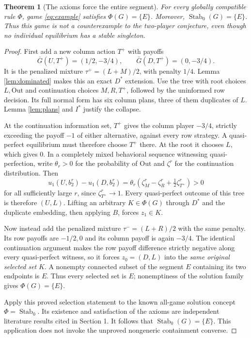 \documentclass[11pt]{article}
\newcommand{\Stab}{\operatorname{Stab}_0}
\newtheorem{theorem}{Theorem}[section]
\theoremstyle{definition}
\theoremstyle{remark}
\begin{document}
\begin{theorem}[The axioms force the entire segment]\label{thm:segment}
For every globally compatible rule $\Phi$, game \eqref{eq:example}
satisfies $\Phi(G)=\{E\}$. Moreover, $\Stab(G)=\{E\}$.
Thus this game is not a counterexample to the two-player conjecture,
even though no individual equilibrium has a stable singleton.
\end{theorem}
\begin{proof}
First add a new column action $T^+$ with payoffs
\[
 \bar G(U,T^+)=(1/2,-3/4),\qquad
 \bar G(D,T^+)=(0,-3/4).
\]
It is the penalized mixture $\tau^+=(L+M)/2$, with penalty $1/4$.
Lemma \ref{lem:dominated} makes this an exact $D^*$ extension.
Use the tree with root choices $L,\mathrm{Out}$ and continuation
choices $M,R,T^+$, followed by the uninformed row decision. Its full
normal form has six column plans, three of them duplicates of $L$.
Lemma \ref{lem:plans} and $I^*$ justify the collapse.

At the continuation information set, $T^+$ gives the column player
$-3/4$, strictly exceeding the payoff $-1$ of either alternative,
against every row strategy. A quasi-perfect equilibrium must therefore
choose $T^+$ there. At the root it chooses $L$, which gives $0$.
In a completely mixed behavioral sequence witnessing quasi-perfection,
write $\theta_r>0$ for the probability of $\mathrm{Out}$ and
$\zeta^r$ for the continuation distribution. Then
\[
 u_1(U,b_2^r)-u_1(D,b_2^r)
 =\theta_r(\zeta_M^r-\zeta_R^r+\tfrac12\zeta_{T^+}^r)>0
\]
for all sufficiently large $r$, since $\zeta_{T^+}^r\to1$.
Every quasi-perfect outcome of this tree is therefore $(U,L)$.
Lifting an arbitrary $K\in\Phi(G)$ through $D^*$ and the duplicate
embedding, then applying $B$, forces $z_1\in K$.

Now instead add the penalized mixture $\tau^-=(L+R)/2$ with the same
penalty. Its row payoffs are $-1/2,0$ and its column payoff is again
$-3/4$. The identical continuation argument makes the row payoff difference
strictly negative along every quasi-perfect witness, so it forces
$z_0=(D,L)$ into the \emph{same original selected set} $K$.
A nonempty connected subset of the segment $E$ containing its two
endpoints is $E$. Thus every selected set is $E$; nonemptiness of the
solution family gives $\Phi(G)=\{E\}$.

Apply this proved selection statement to the known all-game solution
concept $\Phi=\Stab$. Its existence and satisfaction of the axioms are
independent literature results cited in Section 1. It follows that
$\Stab(G)=\{E\}$. This application does not invoke the unproved
nongeneric containment converse.
\end{proof}
\end{document}

